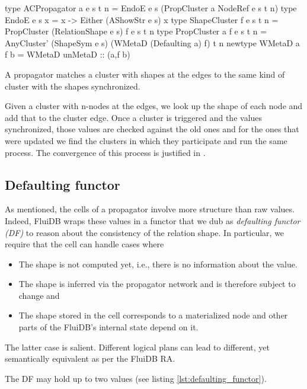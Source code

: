 \begin{code}
  \begin{haskellcode}
    type ACPropagator a e s t n =
      EndoE e s (PropCluster a NodeRef e s t n)
    type EndoE e s x = x -> Either (AShowStr e s) x
    type ShapeCluster f e s t n =
      PropCluster (RelationShape e s) f e s t n
    type PropCluster a f e s t n =
      AnyCluster' (ShapeSym e s) (WMetaD (Defaulting a) f) t n
    newtype WMetaD a f b = WMetaD { unMetaD :: (a,f b)}
  \end{haskellcode}
  \caption{\label{lst:acpropagator}A propagator matches a cluster with
    shapes at the edges to the same kind of cluster with the shapes
    synchronized.}
\end{code}

Given a cluster with n-nodes at the edges, we look up the shape of each
node and add that to the cluster edge.  Once a cluster is triggered
and the values synchronized, those values are checked against the old
ones and for the ones that were updated we find the clusters in which
they participate and run the same process. The convergence of this
process is justified in \cite{kuperLVarsLatticebasedData2013}.

\subsection{Defaulting functor}

As mentioned, the cells of a propagator involve more structure than
raw values. Indeed, FluiDB wraps these values in a functor that we dub
as \emph{defaulting functor (DF)} to reason about the consistency of
the relation shape. In particular, we require that the cell can handle
cases where

\begin{itemize}
\item The shape is not computed yet, i.e., there is no information
  about the value.
\item The shape is inferred via the propagator network and is
therefore subject to change and
\item The shape stored in the cell corresponds to a materialized node
and other parts of the FluiDB's internal state depend on it.
\end{itemize}

The latter case is salient. Different logical plans can lead to
different, yet semantically equivalent as per the FluiDB RA.

The DF may hold up to two values (see listing
\ref{lst:defaulting_functor}).

